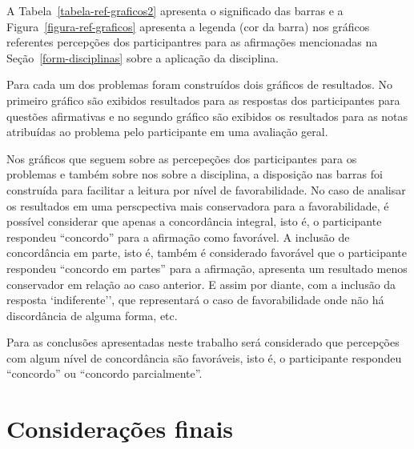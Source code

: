 A Tabela~\ref{tabela-ref-graficos2} apresenta o significado das barras
e a Figura~\ref{figura-ref-graficos} apresenta a legenda (cor da barra)
nos gráficos referentes percepções dos participantres para as
afirmações mencionadas na Seção~\ref{form-disciplinas} sobre
a aplicação da disciplina.

Para cada um dos problemas foram construídos dois gráficos de resultados.
No primeiro gráfico são exibidos resultados para as respostas
dos participantes para questões afirmativas e
no segundo gráfico são exibidos os resultados para as notas atribuídas
ao problema pelo participante em uma avaliação geral.

Nos gráficos que seguem sobre as percepeções dos participantes para os
problemas e também sobre nos sobre a disciplina, a disposição nas barras
foi construída para facilitar a leitura por nível de favorabilidade.
No caso de analisar os resultados em uma perscpectiva mais conservadora
para a favorabilidade, é possível considerar que apenas a concordância
integral, isto é, o participante respondeu ``concordo'' para
a afirmação como favorável.
A inclusão de concordância em parte, isto é, também é considerado favorável que
o participante respondeu ``concordo em partes'' para a afirmação,
apresenta um resultado menos conservador em relação ao caso anterior.
E assim por diante, com a inclusão da resposta `indiferente'', que
representará o caso de favorabilidade onde não há discordância de alguma forma,
etc.

Para as conclusões apresentadas neste trabalho será considerado
que percepções com algum nível de concordância são favoráveis, isto é,
o participante respondeu ``concordo'' ou ``concordo parcialmente''.





\section{Considerações finais}
\label{sec-consideracoes-resultados}
